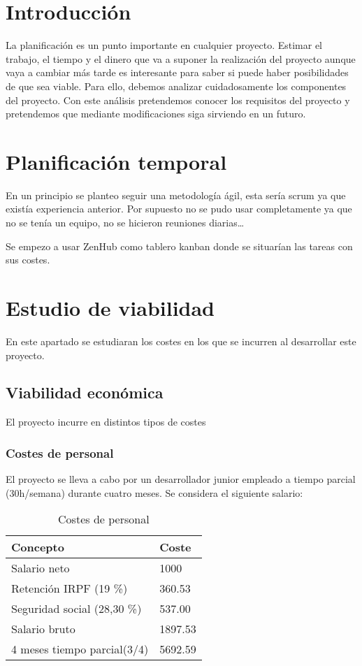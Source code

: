 
\section{Introducción}

La planificación es un punto importante en cualquier proyecto. Estimar el trabajo, el tiempo y el dinero que va a suponer la realización del proyecto aunque vaya a cambiar más tarde es interesante para saber si puede haber posibilidades de que sea viable. Para ello, debemos analizar cuidadosamente los componentes del proyecto. Con este análisis pretendemos conocer los requisitos del proyecto y pretendemos que mediante modificaciones siga sirviendo en un futuro.

\section{Planificación temporal}
En un principio se planteo seguir una metodología ágil, esta sería scrum ya que existía experiencia anterior. Por supuesto no se pudo usar completamente ya que no se tenía un equipo, no se hicieron reuniones diarias\ldots

Se empezo a usar ZenHub como tablero kanban donde se situarían las tareas con sus costes.


\section{Estudio de viabilidad}
En este apartado se estudiaran los costes en los que se incurren al desarrollar este proyecto.

\subsection{Viabilidad económica}
El proyecto incurre en distintos tipos de costes

\subsubsection{Costes de personal}
El proyecto se lleva a cabo por un desarrollador junior empleado a tiempo parcial (30h/semana) durante cuatro meses. Se considera el siguiente salario:

\begin{table}[]
\centering
\caption{Costes de personal}
\label{Salario}
\begin{tabular}{@{}ll@{}}
\toprule
Concepto & Coste \\ \midrule
Salario neto & 1000 \\
Retención IRPF (19 \%) & 360.53 \\
Seguridad social (28,30 \%) & 537.00 \\
Salario bruto & 1897.53 \\ \midrule
4 meses tiempo parcial(3/4) & 5692.59 \\ \bottomrule
\end{tabular}
\end{table}

